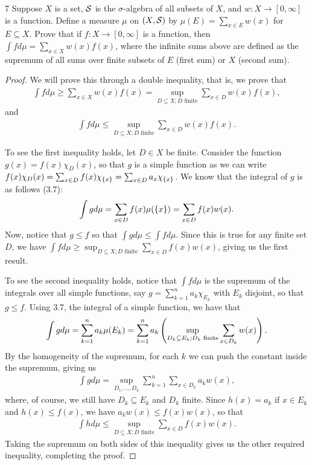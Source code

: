 \begin{exercise}{7}
Suppose $X$ is a set, $\mathcal{S}$ is the $\sigma$-algebra of all subsets of $X$, and $w: X \to [0, \infty]$ is a function.
Define a measure $\mu$ on $(X, \mathcal{S})$ by $\mu(E) = \sum_{x \in E} w(x)$ for $E \subseteq X$.
Prove that if $f: X \to [0,\infty]$ is a function, then $\int f d\mu = \sum_{x \in X} w(x)f(x)$, where the infinite sums above are defined as the supremum of all sums over finite subsets of $E$ (first sum) or $X$ (second sum).
\end{exercise}
\begin{proof}
We will prove this through a double inequality, that is, we prove that 
\begin{align*}
    \int f d\mu \geq \sum_{x \in X} w(x)f(x) = \sup_{D \subseteq X; D \text{ finite}} \sum_{x \in D} w(x) f(x),
\end{align*}
and
\begin{align*}
    \int f d\mu \leq \sup_{D \subseteq X; D \text{ finite}} \sum_{x \in D} w(x) f(x).
\end{align*}

To see the first inequality holds, let $D \in X$ be finite.
Consider the function $g(x) = f(x)\chi_{D}(x)$, so that $g$ is a simple function as we can write $f(x)\chi_{D}(x) = \sum_{x \in D} f(x) \chi_{\{x\}} = \sum_{x \in D} a_x \chi_{\{x\}}$.
We know that the integral of $g$ is as follows (3.7):
\begin{align*}
    \int g d\mu
    = \sum_{x \in D} f(x)\mu(\{x\})
    = \sum_{x \in D} f(x)w(x).
\end{align*}
Now, notice that $g \leq f$ so that $\int g d\mu \leq \int f d\mu$.
Since this is true for any finite set $D$, we have $\int f d\mu \geq \sup_{D \subseteq X; D \text{ finite}} \sum_{x \in D} f(x)w(x)$, giving us the first result.

To see the second inequality holds, notice that $\int f d\mu$ is the supremum of the integrals over all simple functions, say $g =\sum_{k = 1
}^n a_k \chi_{E_k}$ with $E_k$ disjoint, so that $g \leq f$.
Using 3.7, the integral of a simple function, we have that 
\begin{align*}
    \int g d\mu 
    = \sum_{k = 1}^n a_k \mu(E_k) 
    = \sum_{k = 1}^n a_k \left( \sup_{D_k \subseteq E_k; D_k \text{ finite}} \sum_{x \in D_k} w(x)\right).
\end{align*}
By the homogeneity of the supremum, for each $k$ we can push the constant inside the supremum, giving us 
\begin{align*}
    \int g d\mu 
    =  \sup_{D_1, \dots, D_k} \sum_{k = 1}^n \sum_{x \in D_k} a_k w(x),
\end{align*}
where, of course, we still have  $D_k \subseteq E_k$  and $D_k$ finite.
Since $h(x) = a_k$ if $x \in E_k$ and $h(x) \leq f(x)$, we have $a_k w(x) \leq f(x) w(x)$, so that 
\begin{align*}
    \int h d\mu 
    \leq \sup_{D \subseteq X; D \text{ finite}} \sum_{x \in D} f(x) w(x).
\end{align*}
Taking the supremum on both sides of this inequality gives us the other required inequality, completing the proof.
\end{proof}

